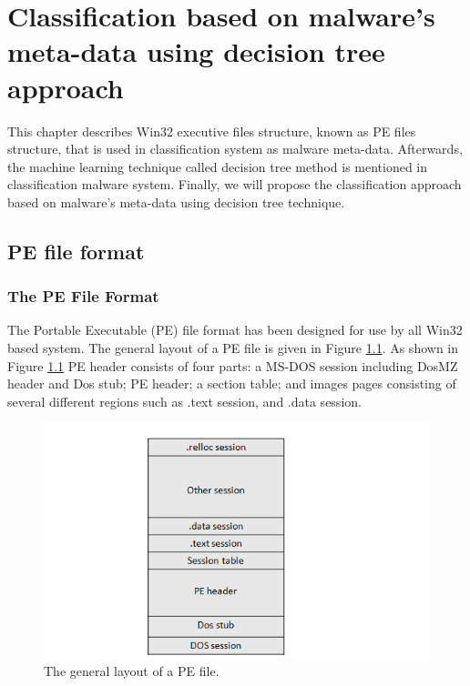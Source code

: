 \chapter{Classification based on malware's meta-data using decision tree approach}\label{chap:4}
%
%
This chapter describes Win32 executive files structure, known as PE files structure, that is used in classification system as malware meta-data. Afterwards, the machine learning technique called decision tree method is mentioned in classification malware system. Finally, we will propose the classification approach based on malware's meta-data using decision tree technique. 

\section{PE file format\cite{peheaderci}}
\subsection{The PE File Format}

The Portable Executable (PE) file format has been designed for use by all Win32 based system. The general layout of a PE file is given in Figure \ref{fig:pefiles}. As shown in Figure \ref{fig:pefiles} PE header consists of four parts: a MS-DOS session including DosMZ header and Dos stub; PE header; a section table; and images pages consisting of several different regions such as .text session, and .data session.
\begin{figure}[h!]
\centering
\includegraphics[width=1\textwidth]{graph/pefiles.png}
\caption{The general layout of a PE file.}
\label{fig:pefiles}
\end{figure}

